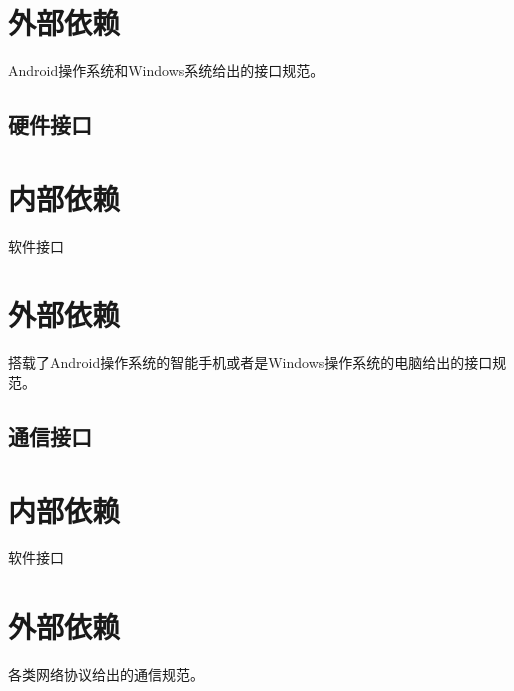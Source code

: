 \section{外部依赖}
Android操作系统和Windows系统给出的接口规范。
\subsection{硬件接口}
\section{内部依赖}
软件接口

\section{外部依赖}
搭载了Android操作系统的智能手机或者是Windows操作系统的电脑给出的接口规范。
\subsection{通信接口}
\section{内部依赖}
软件接口

\section{外部依赖}
各类网络协议给出的通信规范。